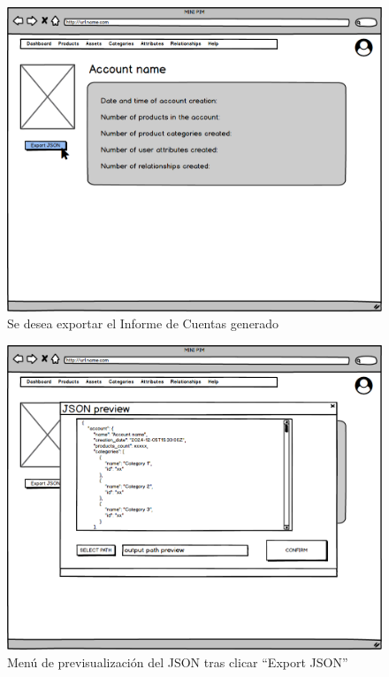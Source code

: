 \newpage %


\begin{figure}[H]
    \includegraphics[width=1\linewidth]{assets/mockups/RF1.9.1_1ExportarInformeCuenta.png}
    \caption{Se desea exportar el Informe de Cuentas generado}
   \end{figure}
\vspace{1.0cm}

\begin{figure}[H]
    \includegraphics[width=1\linewidth]{assets/mockups/RF1.9.1_2ExportarInformeCuenta.png}
    \caption{Menú de previsualización del JSON tras clicar \enquote{Export JSON}}
   \end{figure}
\vspace{1.0cm}

